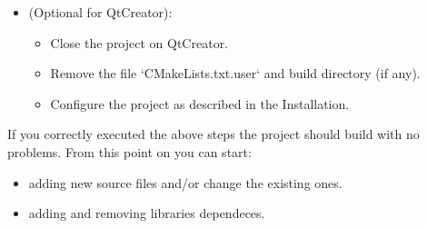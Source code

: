 \begin{itemize}
      \item
            (Optional for QtCreator):
            \begin{itemize}
                  \item Close the project on QtCreator.

                  \item Remove the file `CMakeLists.txt.user` and build directory (if any).

                  \item Configure the project as described in the Installation.
            \end{itemize}
\end{itemize}


If you correctly executed the above steps the project should build with
no problems. From this point on you can start:

\begin{itemize}
      \item
            adding new source files and/or change the existing ones.
\end{itemize}

\begin{itemize}
      \item
            adding and removing libraries dependeces.
\end{itemize}
